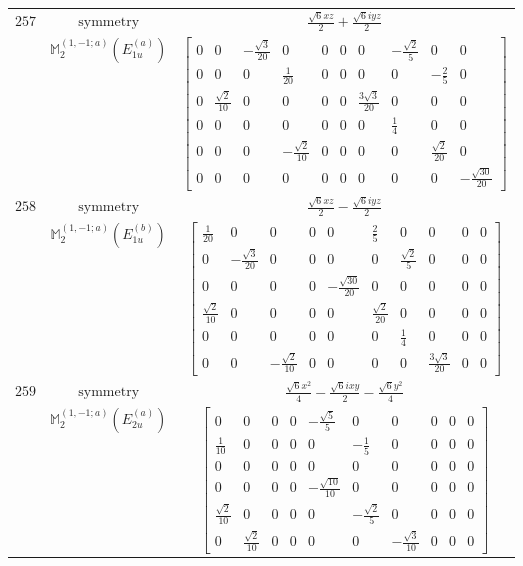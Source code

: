 \documentclass[fleqn,8pt,landscape]{jsarticle}
\begin{document}
\begin{longtable}{ccc}
$ 257 $ & $ \text{symmetry} $ & $ \frac{\sqrt{6} x z}{2} + \frac{\sqrt{6} i y z}{2} $ \\
$  $ & $ \mathbb{M}_{2}^{(1,-1;a)}(E_{1u}^{(a)}) $ & $ \begin{bmatrix} 0 & 0 & - \frac{\sqrt{3}}{20} & 0 & 0 & 0 & 0 & - \frac{\sqrt{2}}{5} & 0 & 0 \\ 0 & 0 & 0 & \frac{1}{20} & 0 & 0 & 0 & 0 & - \frac{2}{5} & 0 \\ 0 & \frac{\sqrt{2}}{10} & 0 & 0 & 0 & 0 & \frac{3 \sqrt{3}}{20} & 0 & 0 & 0 \\ 0 & 0 & 0 & 0 & 0 & 0 & 0 & \frac{1}{4} & 0 & 0 \\ 0 & 0 & 0 & - \frac{\sqrt{2}}{10} & 0 & 0 & 0 & 0 & \frac{\sqrt{2}}{20} & 0 \\ 0 & 0 & 0 & 0 & 0 & 0 & 0 & 0 & 0 & - \frac{\sqrt{30}}{20} \end{bmatrix} $ \\ \hline
$ 258 $ & $ \text{symmetry} $ & $ \frac{\sqrt{6} x z}{2} - \frac{\sqrt{6} i y z}{2} $ \\
$  $ & $ \mathbb{M}_{2}^{(1,-1;a)}(E_{1u}^{(b)}) $ & $ \begin{bmatrix} \frac{1}{20} & 0 & 0 & 0 & 0 & \frac{2}{5} & 0 & 0 & 0 & 0 \\ 0 & - \frac{\sqrt{3}}{20} & 0 & 0 & 0 & 0 & \frac{\sqrt{2}}{5} & 0 & 0 & 0 \\ 0 & 0 & 0 & 0 & - \frac{\sqrt{30}}{20} & 0 & 0 & 0 & 0 & 0 \\ \frac{\sqrt{2}}{10} & 0 & 0 & 0 & 0 & \frac{\sqrt{2}}{20} & 0 & 0 & 0 & 0 \\ 0 & 0 & 0 & 0 & 0 & 0 & \frac{1}{4} & 0 & 0 & 0 \\ 0 & 0 & - \frac{\sqrt{2}}{10} & 0 & 0 & 0 & 0 & \frac{3 \sqrt{3}}{20} & 0 & 0 \end{bmatrix} $ \\ \hline
$ 259 $ & $ \text{symmetry} $ & $ \frac{\sqrt{6} x^{2}}{4} - \frac{\sqrt{6} i x y}{2} - \frac{\sqrt{6} y^{2}}{4} $ \\
$  $ & $ \mathbb{M}_{2}^{(1,-1;a)}(E_{2u}^{(a)}) $ & $ \begin{bmatrix} 0 & 0 & 0 & 0 & - \frac{\sqrt{5}}{5} & 0 & 0 & 0 & 0 & 0 \\ \frac{1}{10} & 0 & 0 & 0 & 0 & - \frac{1}{5} & 0 & 0 & 0 & 0 \\ 0 & 0 & 0 & 0 & 0 & 0 & 0 & 0 & 0 & 0 \\ 0 & 0 & 0 & 0 & - \frac{\sqrt{10}}{10} & 0 & 0 & 0 & 0 & 0 \\ \frac{\sqrt{2}}{10} & 0 & 0 & 0 & 0 & - \frac{\sqrt{2}}{5} & 0 & 0 & 0 & 0 \\ 0 & \frac{\sqrt{2}}{10} & 0 & 0 & 0 & 0 & - \frac{\sqrt{3}}{10} & 0 & 0 & 0 \end{bmatrix} $ \\ \hline

\end{longtable}
\end{document}
